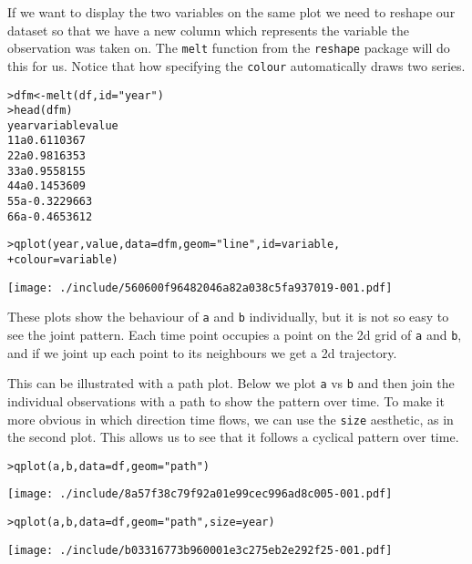 If we want to display the two variables on the same plot we need to reshape our dataset so that we have a new column which represents the variable the observation was taken on.  The {\tt melt} function from the {\tt reshape} package will do this for us.  Notice that how specifying the {\tt colour} automatically draws two series.

\begin{alltt}
> dfm <- melt(df, id = "year")
> head(dfm)
  year variable      value
1    1        a  0.6110367
2    2        a  0.9816353
3    3        a  0.9558155
4    4        a  0.1453609
5    5        a -0.3229663
6    6        a -0.4653612

> qplot(year, value, data = dfm, geom = "line", id = variable, 
+     colour = variable)
\end{alltt}
\texttt{[image: ./include/560600f96482046a82a038c5fa937019-001.pdf]}
\begin{alltt}

\end{alltt}

These plots show the behaviour of {\tt a} and {\tt b} individually, but it is not so easy to see the joint pattern.  Each time point occupies a point on the 2d grid of {\tt a} and {\tt b}, and if we joint up each point to its neighbours we get a 2d trajectory.

This can be illustrated with a path plot.  Below we plot {\tt a} vs {\tt b} and then join the individual observations with a path to show the pattern over time.  To make it more obvious in which direction time flows, we can use the {\tt size} aesthetic, as in the second plot.   This allows us to see that it follows a cyclical pattern over time.

\begin{alltt}
> qplot(a, b, data = df, geom = "path")
\end{alltt}
\texttt{[image: ./include/8a57f38c79f92a01e99cec996ad8c005-001.pdf]}
\begin{alltt}

> qplot(a, b, data = df, geom = "path", size = year)
\end{alltt}
\texttt{[image: ./include/b03316773b960001e3c275eb2e292f25-001.pdf]}
\begin{alltt}

\end{alltt}

